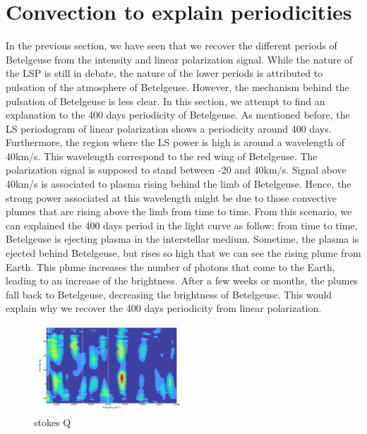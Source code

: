 \documentclass{aa}
\begin{document}
\section{Convection to explain periodicities}

In the previous section, we have seen that we recover the different periods of Betelgeuse from the intensity and linear polarization signal. While the nature of the LSP is still in debate, the nature of the lower periods is attributed to pulsation of the atmosphere of Betelgeuse. However, the mechanism behind the pulsation of Betelgeuse is less clear. In this section, we attempt to find an explanation to the 400 days periodicity of Betelgeuse. As mentioned before, the LS periodogram of linear polarization shows a periodicity around 400 days. Furthermore, the region where the LS power is high is around a wavelength of 40km/s. This wavelength correspond to the red wing of Betelgeuse. The polarization signal is supposed to stand between -20 and 40km/s. Signal above 40km/s is associated to plasma rising behind the limb of Betelgeuse. Hence, the strong power associated at this wavelength might be due to those convective plumes that are rising above the limb from time to time. From this scenario, we can explained the 400 days period in the light curve as follow: from time to time, Betelgeuse is ejecting plasma in the interstellar medium. Sometime, the plasma is ejected behind Betelgeuse, but rises so high that we can see the rising plume from Earth. This plume increases the number of photons that come to the Earth, leading to an increase of the brightness. After a few weeks or months, the plumes fall back to Betelgeuse, decreasing the brightness of Betelgeuse. This would explain why we recover the 400 days periodicity from linear polarization. 




\begin{figure}[!h]
    \centering
    \includegraphics[width=0.5\textwidth]{LS stokes Q.png}
    \caption{stokes Q}
    \label{LS Q}
\end{figure}
\end{document}
